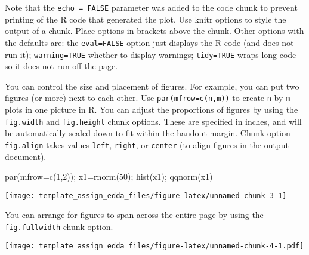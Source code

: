 \documentclass[
  11pt,
]{article}
\newenvironment{Shaded}{\begin{snugshade}}{\end{snugshade}}
\newcommand{\AttributeTok}[1]{\textcolor[rgb]{0.77,0.63,0.00}{#1}}
\newcommand{\DecValTok}[1]{\textcolor[rgb]{0.00,0.00,0.81}{#1}}
\newcommand{\FunctionTok}[1]{\textcolor[rgb]{0.00,0.00,0.00}{#1}}
\newcommand{\NormalTok}[1]{#1}
\newcommand{\OtherTok}[1]{\textcolor[rgb]{0.56,0.35,0.01}{#1}}
\newcommand{\SpecialCharTok}[1]{\textcolor[rgb]{0.00,0.00,0.00}{#1}}
\newcommand{\StringTok}[1]{\textcolor[rgb]{0.31,0.60,0.02}{#1}}
\begin{document}
Note that the \texttt{echo\ =\ FALSE} parameter was added to the code
chunk to prevent printing of the R code that generated the plot. Use
knitr options to style the output of a chunk. Place options in brackets
above the chunk. Other options with the defaults are: the
\texttt{eval=FALSE} option just displays the R code (and does not run
it); \texttt{warning=TRUE} whether to display warnings;
\texttt{tidy=TRUE} wraps long code so it does not run off the page.

You can control the size and placement of figures. For example, you can
put two figures (or more) next to each other. Use
\texttt{par(mfrow=c(n,m))} to create \texttt{n} by \texttt{m} plots in
one picture in R. You can adjust the proportions of figures by using the
\texttt{fig.width} and \texttt{fig.height} chunk options. These are
specified in inches, and will be automatically scaled down to fit within
the handout margin. Chunk option \texttt{fig.align} takes values
\texttt{left}, \texttt{right}, or \texttt{center} (to align figures in
the output document).

\begin{Shaded}
\begin{Highlighting}[]
\FunctionTok{par}\NormalTok{(}\AttributeTok{mfrow=}\FunctionTok{c}\NormalTok{(}\DecValTok{1}\NormalTok{,}\DecValTok{2}\NormalTok{)); x1}\OtherTok{=}\FunctionTok{rnorm}\NormalTok{(}\DecValTok{50}\NormalTok{); }\FunctionTok{hist}\NormalTok{(x1); }\FunctionTok{qqnorm}\NormalTok{(x1)}
\end{Highlighting}
\end{Shaded}

\begin{center}\texttt{[image: template\_assign\_edda\_files/figure-latex/unnamed-chunk-3-1]} \end{center}

You can arrange for figures to span across the entire page by using the
\texttt{fig.fullwidth} chunk option.

\begin{Shaded}
\end{Shaded}

\texttt{[image: template\_assign\_edda\_files/figure-latex/unnamed-chunk-4-1.pdf]}
\end{document}
